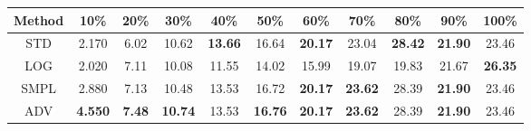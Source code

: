 \documentclass{standalone}
\begin{document}
\begin{tabular}{c|cccccccccc}
      \toprule
      Method & 10\% & 20\% & 30\% & 40\% & 50\% & 60\% & 70\% & 80\% & 90\% & 100\% \\
      \midrule
STD & 2.170 & 6.02 & 10.62 & \textbf{13.66} & 16.64 & \textbf{20.17} & 23.04 & \textbf{28.42} & \textbf{21.90} & 23.46\\
LOG & 2.020 & 7.11 & 10.08 & 11.55 & 14.02 & 15.99 & 19.07 & 19.83 & 21.67 & \textbf{26.35}\\
SMPL & 2.880 & 7.13 & 10.48 & 13.53 & 16.72 & \textbf{20.17} & \textbf{23.62} & 28.39 & \textbf{21.90} & 23.46\\
ADV & \textbf{4.550} & \textbf{7.48} & \textbf{10.74} & 13.53 & \textbf{16.76} & \textbf{20.17} & \textbf{23.62} & 28.39 & \textbf{21.90} & 23.46\\
  \bottomrule
\end{tabular}
\end{document}
